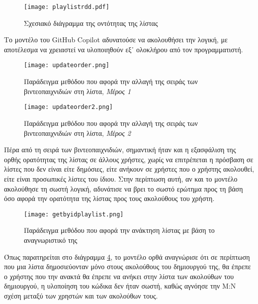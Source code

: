   \begin{figure}[H]
    \begin{center}
      \texttt{[image: playlistrdd.pdf]}
      \caption{Σχεσιακό διάγραμμα της οντότητας της λίστας}
    \end{center}
    \label{fig:playlistRdd}
  \end{figure}

  Το μοντέλο του \textlatin{GitHub Copilot} αδυνατούσε να ακολουθήσει την
  λογική, με αποτέλεσμα να χρειαστεί να υλοποιηθούν εξ᾽ ολοκλήρου από τον
  προγραμματιστή.

  \begin{figure}[H]
    \begin{center}
      \texttt{[image: updateorder.png]}
      \caption{Παράδειγμα μεθόδου που αφορά την αλλαγή της σειράς των
      βιντεοπαιχνιδιών στη λίστα, \textit{Μέρος 1}}
    \end{center}
    \label{fig:updateOrder}
  \end{figure}

  \begin{figure}[H]
    \begin{center}
      \texttt{[image: updateorder2.png]}
      \caption{Παράδειγμα μεθόδου που αφορά την αλλαγή της σειράς των
      βιντεοπαιχνιδιών στη λίστα, \textit{Μέρος 2}}
    \end{center}
    \label{fig:updateOrder2}
  \end{figure}

  Πέρα από τη σειρά των βιντεοπαιχνιδιών, σημαντική ήταν και η εξασφάλιση
  της ορθής ορατότητας της λίστας σε άλλους χρήστες, χωρίς να επιτρέπεται
  η πρόσβαση σε λίστες που δεν είναι είτε δημόσιες, είτε ανήκουν σε
  χρήστες που ο χρήστης ακολουθεί, είτε είναι προσωπικές λίστες του ίδιου.
  Στην περίπτωση αυτή, αν και το μοντέλο ακολούθησε τη σωστή λογική,
  αδυνάτισε να βρει το σωστό ερώτημα προς τη βάση όσο αφορά την ορατότητα
  της λίστας προς τους ακολούθους του χρήστη.

  \begin{figure}[H]
    \begin{center}
      \texttt{[image: getbyidplaylist.png]}
      \caption{Παράδειγμα μεθόδου που αφορά την ανάκτηση λίστας με βάση το
      αναγνωριστικό της}
    \end{center}
    \label{fig:getByIdPlaylist}
  \end{figure}

  Όπως παρατηρείται στο διάγραμμα \ref{fig:getByIdPlaylist}, το μοντέλο
  ορθά αναγνώρισε ότι σε περίπτωση που μια λίστα δημοσιεύονταν μόνο στους
  ακολούθους του δημιουργού της, θα έπρεπε ο χρήστης που την ανακτά θα
  έπρεπε να ανήκει στην λίστα των ακολούθων του δημιουργού, η υλοποίηση
  του κώδικα δεν ήταν σωστή, καθώς αγνόησε την Μ:Ν σχέση μεταξύ των
  χρηστών και των ακολούθων τους.

